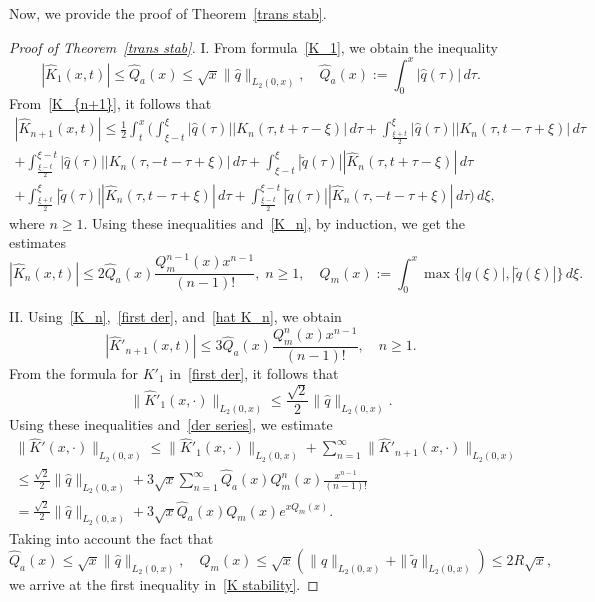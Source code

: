 \documentclass[a4paper, 12pt] {article}
\theoremstyle{plain}
\theoremstyle{remark}
\theoremstyle{plain}
\theoremstyle{definition}
\numberwithin{equation}{section}
\begin{document}
Now, we provide the proof of Theorem~\ref{trans stab}.
\begin{proof}[Proof of Theorem~\ref{trans stab}]
I. 
From formula~\eqref{K_1}, we obtain the inequality
\begin{equation*} \label{ind base}
|\hat K_1(x, t)| \le \hat Q_a(x) \le \sqrt{x} \| \hat q\|_{L_2(0, x)}, \quad \hat Q_a(x) := \int_0^x |\hat q(\tau)|\,d\tau.
\end{equation*}
From~\eqref{K_{n+1}}, it follows that
\begin{equation*}
\begin{split}
|\hat K_{n+1}(x, t)| \le \frac12 \int_t^x\Bigg( \int_{\xi-t}^\xi |\hat q(\tau)| |K_n(\tau,t+\tau-\xi)|\,d\tau +\int_{\frac{\xi+t}{2}}^\xi |\hat q(\tau)| |K_n(\tau,t-\tau+\xi)|\,d\tau \\
+\int_{\frac{\xi-t}{2}}^{\xi-t} |\hat q(\tau)| |K_n(\tau,-t-\tau+\xi)|\,d\tau +  \int_{\xi-t}^\xi |\tilde q(\tau)| |\hat K_n(\tau,t+\tau-\xi)|\,d\tau \\
+\int_{\frac{\xi+t}{2}}^\xi |\tilde q(\tau)||\hat K_n(\tau,t-\tau+\xi)|\,d\tau + \int_{\frac{\xi-t}{2}}^{\xi-t} |\tilde q(\tau)||\hat K_n(\tau,-t-\tau+\xi)|\,d\tau\Bigg) \,d\xi,
\end{split}
\end{equation*}
where $n \ge 1.$
Using these inequalities and~\eqref{K_n}, by induction, we get the estimates
\begin{equation} \label{hat K_n}
|\hat K_n(x, t)|\le 2 \hat Q_a(x) \frac{Q_{m}^{n-1}(x) x^{n-1}}{(n-1)!}, \; n \ge 1, \quad Q_{m}(x) := \int_0^x \max\{ |q(\xi)|, |\tilde q(\xi)|\}\, d\xi.
\end{equation}


II. Using~\eqref{K_n},~\eqref{first der}, and~\eqref{hat K_n}, we obtain
$$|\hat K'_{n+1}(x, t)| \le 3\hat Q_a(x) \frac{Q^{n}_{m}(x) x^{n-1}}{(n-1)!}, \quad n \ge 1.$$
From the formula for $K'_1$ in~\eqref{first der}, it follows that
$$\| \hat K'_1(x, \cdot) \|_{L_2(0,x)} \le \frac{\sqrt2}{2}\| \hat q\|_{L_2(0, x)}.$$
Using these inequalities and~\eqref{der series}, we estimate
\begin{equation*}\begin{split}
\|\hat K'(x, \cdot)\|_{L_2(0, x)} \le \big\| \hat K'_1(x, \cdot) \big\|_{L_2(0,x)} + \sum_{n=1}^\infty \big\| \hat K'_{n+1}(x, \cdot) \big\|_{L_2(0,x)} \\
\le \frac{\sqrt2}{2}\| \hat q\|_{L_2(0, x)}
+ 3\sqrt x \sum_{n=1}^\infty \hat Q_a(x) Q^n_{m}(x) \frac{x^{n-1}}{(n-1)!}\\
= \frac{\sqrt2}{2}\| \hat q\|_{L_2(0, x)} +
3\sqrt x \hat Q_a(x) Q_{m}(x) e^{x Q_m(x)}.
\end{split}
\end{equation*}
Taking into account the fact that
\begin{equation} \label{Q_a}
\hat Q_a(x) \le \sqrt{x} \| \hat q \|_{L_2(0, x)}, \quad Q_{m}(x) \le \sqrt x (\| q\|_{L_2(0, x)} + \| \tilde q\|_{L_2(0, x)}) \le 2 R\sqrt x,
\end{equation}
we arrive at the first inequality in~\eqref{K stability}.


\end{proof}
\end{document}
